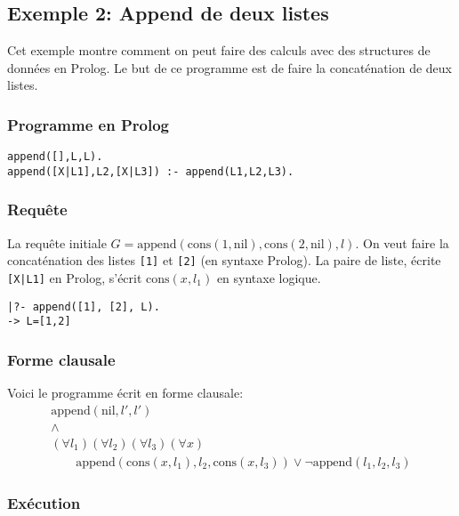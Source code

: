 \subsection{Exemple 2: Append de deux listes}

Cet exemple montre comment on peut faire des calculs avec des structures de données en Prolog.
Le but de ce programme est de faire la concaténation de deux listes.

\subsubsection{Programme en Prolog}

\begin{verbatim}
append([],L,L).
append([X|L1],L2,[X|L3]) :- append(L1,L2,L3).
\end{verbatim}

\subsubsection{Requête}

La requête initiale $G = \mathrm{append}(\mathrm{cons}(1,\mathrm{nil}), \mathrm{cons}(2,\mathrm{nil}), l)$.
On veut faire la concaténation des listes \verb+[1]+ et \verb+[2]+ (en syntaxe Prolog).
La paire de liste, écrite \verb+[X|L1]+ en Prolog, s'écrit $\mathrm{cons}(x,l_1)$ en syntaxe logique.

\begin{verbatim}
|?- append([1], [2], L).
-> L=[1,2]
\end{verbatim}

\subsubsection{Forme clausale}

Voici le programme écrit en forme clausale:
\begin{equation}
\begin{array}{l}
\mathrm{append}(\mathrm{nil},l',l') \\
\wedge\\
(\forall l_1) (\forall l_2) (\forall l_3) (\forall x) \\
\quad \quad \mathrm{append}(\mathrm{cons}(x,l_1),l_2,\mathrm{cons}(x,l_3)) \vee \neg\mathrm{append}(l_1,l_2,l_3)
\end{array}
\end{equation}

\subsubsection{Exécution}


